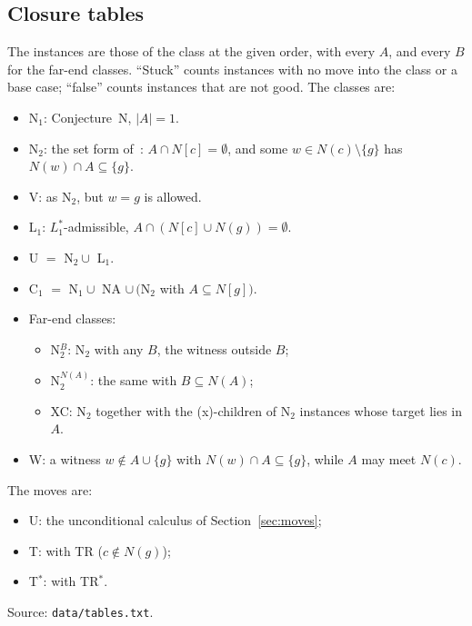 \documentclass[11pt]{amsart}
\theoremstyle{definition}
\begin{document}
\subsection{Closure tables}
The instances are those of the class at the given order, with every $A$, and every $B$ for the
far-end classes. ``Stuck'' counts instances with no move into the class or a base case; ``false''
counts instances that are not good. The classes are:
\begin{itemize}
\item N$_1$: Conjecture~N, $|A|=1$.
\item N$_2$: the set form of~\cite{DL}: $A\cap N[c]=\emptyset$, and some $w\in N(c)\setminus\{g\}$
has $N(w)\cap A\subseteq\{g\}$.
\item V: as N$_2$, but $w=g$ is allowed.
\item L$_1$: $L_1^*$-admissible, $A\cap(N[c]\cup N(g))=\emptyset$.
\item U $=$ N$_2\cup$ L$_1$.
\item C$_1$ $=$ N$_1\cup$ NA $\cup\,($N$_2$ with $A\subseteq N[g])$.
\item Far-end classes:
  \begin{itemize}
  \item N$_2^B$: N$_2$ with any $B$, the witness outside $B$;
  \item N$_2^{N(A)}$: the same with $B\subseteq N(A)$;
  \item XC: N$_2$ together with the (x)-children of N$_2$ instances whose target lies in $A$.
  \end{itemize}
\item W: a witness $w\notin A\cup\{g\}$ with $N(w)\cap A\subseteq\{g\}$, while $A$ may meet $N(c)$.
\end{itemize}
The moves are:
\begin{itemize}
\item U: the unconditional calculus of Section~\ref{sec:moves};
\item T: with TR ($c\notin N(g)$);
\item T$^*$: with TR$^*$.
\end{itemize}
Source: \texttt{data/tables.txt}.
\end{document}

